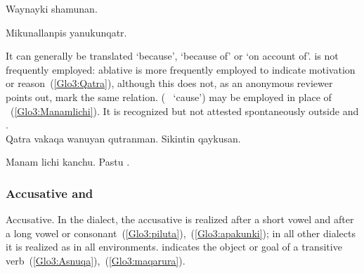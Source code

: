 {%
%
{Waynayki shamunan.}%
{}%
{}{}%

%
{Mikunallanpis yanukunqatr.}%
{}%
{}{}%

\noindent
It can generally be translated ‘because’, ‘because of’ or ‘on account of’.  is not frequently employed: ablative  is more frequently employed to indicate motivation or reason~(\ref{Glo3:Qatra}), although this  does not, as an anonymous reviewer points out, mark the same relation.  (\Sp~ ‘cause’) may be employed in place of ~(\ref{Glo3:Manamlichi}). It is recognized but not attested spontaneously outside \AMV{} and \CH.\\

%
{Qatra vakaqa wanuyan qutranman. Sikintin qaykusan.}%
{}%
{}{}%

%
{Manam lichi kanchu. Pastu .}%
{}%
{}{}%

\subsubsection{Accusative  and }
Accusative. In the \CH{} dialect, the accusative is realized  after a short vowel and  after a long vowel or consonant~(\ref{Glo3:piluta}),~(\ref{Glo3:apakunki}); in all other dialects it is realized as  in all environments.  indicates the object or goal of a transitive verb~(\ref{Glo3:Asnuqa}),~(\ref{Glo3:maqarura}).\\

}
